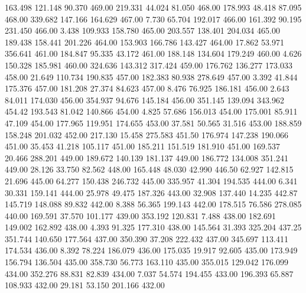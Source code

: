  163.498  121.148   90.370       469.00
 219.331   44.024   81.050       468.00
 178.993   48.418   87.095       468.00
 339.682  147.166  164.629       467.00
   7.730   65.704  192.017       466.00
 161.392   90.195  231.450       466.00
   3.438  109.933  158.780       465.00
 203.557  138.401  204.034       465.00
 189.438  158.441  201.226       464.00
 153.903  166.786  143.427       464.00
  17.862   53.971  356.641       461.00
 184.847   95.335   43.172       461.00
 188.148  134.604  179.249       460.00
   4.626  150.328  185.981       460.00
 324.636  143.312  317.424       459.00
 176.762  136.277  173.033       458.00
  21.649  110.734  190.835       457.00
 182.383   80.938  278.649       457.00
   3.392   41.844  175.376       457.00
 181.208   27.374   84.623       457.00
   8.476   76.925  186.181       456.00
   2.643   84.011  174.030       456.00
 354.937   94.676  145.184       456.00
 351.145  139.094  343.962       454.42
 193.543   81.042  140.866       454.00
   4.825   57.686  156.013       454.00
 175.001   85.911   47.109       454.00
 177.965  119.951  174.655       453.00
  37.581   50.565   31.516       453.00
 188.859  158.248  201.032       452.00
 217.130   15.458  275.583       451.50
 176.974  147.238  190.066       451.00
  35.453   41.218  105.117       451.00
 185.211  151.519  181.910       451.00
 169.537   20.466  288.201       449.00
 189.672  140.139  181.137       449.00
 186.772  134.008  351.241       449.00
  28.126   33.750   82.562       448.00
 165.448   48.030   42.990       446.50
  62.927  142.815   21.696       445.00
  64.277  150.438  246.732       445.00
 335.957   41.304  194.535       444.00
   6.341   30.331  159.141       444.00
  25.978   49.475  187.326       443.00
  32.908  137.440   14.235       442.87
 145.719  148.088   89.832       442.00
   8.388   56.365  199.143       442.00
 178.515   76.586  278.085       440.00
 169.591   37.570  101.177       439.00
 353.192  120.831    7.488       438.00
 182.691  149.002  162.892       438.00
   4.393   91.325  177.310       438.00
 145.564   31.393  325.204       437.25
 351.744  140.650  177.564       437.00
 350.390   37.208  222.432       437.00
 345.697  113.411  174.534       436.00
   8.392   78.224  186.079       436.00
 175.035   19.917   92.605       435.00
 173.949  156.794  136.504       435.00
 358.730   56.773  163.110       435.00
 355.015  129.042  176.099       434.00
 352.276   88.831   82.839       434.00
   7.037   54.574  194.455       433.00
 196.393   65.887  108.933       432.00
  29.181   53.150  201.166       432.00
